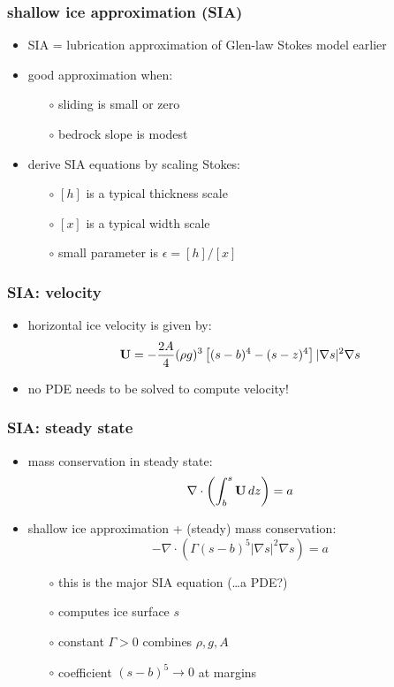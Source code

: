 \documentclass[hide notes,intlimits]{beamer}
\newcommand{\Div}{\nabla\cdot}
\newcommand{\eps}{\epsilon}
\begin{document}
\begin{frame}
  \frametitle{shallow ice approximation (SIA)}

\begin{itemize}
\item SIA = lubrication approximation of Glen-law Stokes model earlier
\item good approximation when:
  \begin{itemize}
  \item[$\circ$] sliding is small or zero
  \item[$\circ$] bedrock slope is modest
  \end{itemize}
\item derive SIA equations by scaling Stokes:
  \begin{itemize}
  \item[$\circ$] $[h]$ is a typical thickness scale
  \item[$\circ$] $[x]$ is a typical width scale
  \item[$\circ$] small parameter is $\eps = [h] / [x]$
  \end{itemize}
\end{itemize}
\end{frame}



\begin{frame}
  \frametitle{SIA: velocity}
 
\begin{itemize}
\item horizontal ice velocity is given by: 
  $${\bf U}  =  - \frac{2 A}{4} (\rho g)^{3} \left[ (s-b)^4 - (s - z)^4  \right] 
|\nabla s |^{2} \nabla s$$
\item no PDE needs to be solved to compute velocity!
\end{itemize}
\end{frame}



\begin{frame}
  \frametitle{SIA: steady state}

\begin{itemize}
\item mass conservation in steady state: 
  $$\Div \left(  \int_b^s {\bf U}\, dz \right)  =  a$$
\item shallow ice approximation + (steady) mass conservation:
  $$- \Div \left(\Gamma (s-b)^5 | \nabla s |^2 \nabla s  \right) =  a$$
  \begin{itemize}
  \vspace{-0.2in}
  \item[$\circ$] this is the major SIA equation (\dots a PDE?)
  \item[$\circ$] computes ice surface $s$
  \item[$\circ$] constant $\Gamma > 0$ combines $\rho,g,A$
  \item[$\circ$] coefficient $(s-b)^5 \to 0$ at margins
  \end{itemize}
\end{itemize}
\end{frame}
\end{document}
